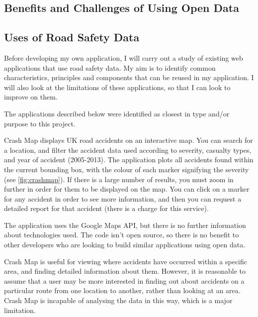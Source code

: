 \documentclass[authoryearcitations]{UoYCSproject}
\begin{document}
\subsection{Benefits and Challenges of Using Open Data}




\subsection{Uses of Road Safety Data}

Before developing my own application, I will carry out a study of existing web applications that use road safety data. My aim is to identify common characteristics, principles and components that can be reused in my application. I will also look at the limitations of these applications, so that I can look to improve on them.

The applications described below were identified as closest in type and/or purpose to this project.
 
Crash Map \citep{crashmap} displays UK road accidents on an interactive map. You can search for a location, and filter the accident data used according to severity, casualty types, and year of accident (2005-2013). The application plots all accidents found within the current bounding box, with the colour of each marker signifying the severity (see \autoref{fig:crashmap}). If there is a large number of results, you must zoom in further in order for them to be displayed on the map. You can click on a marker for any accident in order to see more information, and then you can request a detailed report for that accident (there is a charge for this service).

The application uses the Google Maps API, but there is no further information about technologies used. The code isn't open source, so there is no benefit to other developers who are looking to build similar applications using open data. 

Crash Map is useful for viewing where accidents have occurred within a specific area, and finding detailed information about them. However, it is reasonable to assume that a user may be more interested in finding out about accidents on a particular route from one location to another, rather than looking at an area. Crash Map is incapable of analysing the data in this way, which is a major limitation.
\end{document}
